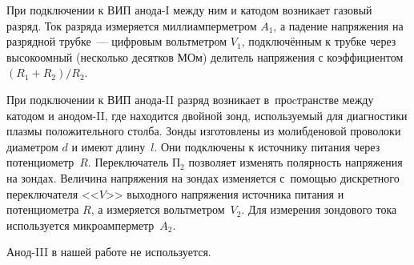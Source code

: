 
При подключении к ВИП анода-I между ним и катодом возникает газовый разряд. Ток разряда измеряется миллиамперметром
$A_1$, а падение напряжения на разрядной трубке~--- цифровым вольтметром $V_{1}$, подключённым к трубке через
высокоомный (несколько десятков МОм) делитель напряжения с коэффициентом $(R_1+R_2)/R_2$.

При подключении к ВИП анода-II разряд возникает в~проcтранстве между катодом и анодом-II, где находится двойной зонд,
используемый для диагностики плазмы положительного столба. Зонды изготовлены из молибденовой проволоки диаметром
$d$ и имеют длину~$l$. Они подключены к источнику питания через потенциометр~$R$. Переключатель
П$_2$ позволяет изменять полярность напряжения на зондах. Величина напряжения на зондах изменяется с~помощью дискретного
переключателя <<$V$>> выходного напряжения источника питания и потенциометра $R$, а измеряется вольтметром~$V_2$. Для
измерения зондового тока используется микроамперметр~$A_2$.

Анод-III в нашей работе не используется.


